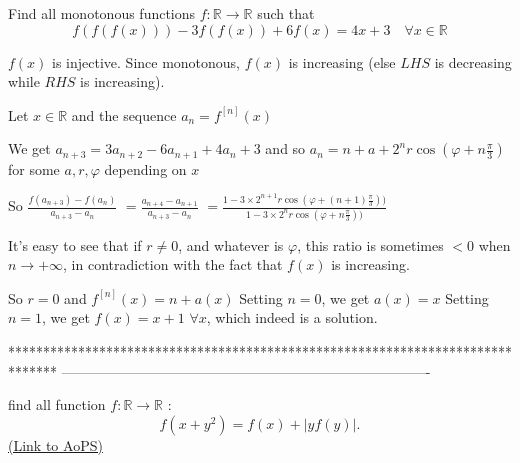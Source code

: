 \begin{solution}
	\begin{tcolorbox}Find all monotonous functions $f: \mathbb R\to\mathbb R$  such that 
\[f (f (f (x)))-3f (f (x))+6f (x) = 4x +3  \quad \forall x\in\mathbb R\]\end{tcolorbox}
$f(x)$ is injective.
Since monotonous, $f(x)$ is increasing (else $LHS$ is decreasing while $RHS$ is increasing).

Let $x\in\mathbb R$ and the sequence $a_n=f^{[n]}(x)$

We get $a_{n+3}=3a_{n+2}-6a_{n+1}+4a_n+3$ and so $a_n=n+a+2^nr\cos(\varphi +n\frac{\pi}3)$ for some $a,r,\varphi$ depending on $x$

So $\frac {f(a_{n+3})-f(a_{n})}{a_{n+3}-a_n}$ $=\frac{a_{n+4}-a_{n+1}}{a_{n+3}-a_n}$ $=\frac{1-3\times 2^{n+1}r\cos(\varphi +(n+1)\frac{\pi}3))}{1-3\times 2^{n}r\cos(\varphi +n\frac{\pi}3))}$

It's easy to see that if $r\ne 0$, and whatever is $\varphi$, this ratio is sometimes $<0$ when $n\to+\infty$, in contradiction with the fact that $f(x)$ is increasing.

So $r=0$ and $f^{[n]}(x)=n+a(x)$
Setting $n=0$, we get $a(x)=x$
Setting $n=1$, we get $\boxed{f(x)=x+1}$ $\forall x$, which indeed is a solution.
\end{solution}
*******************************************************************************
-------------------------------------------------------------------------------

\begin{problem}
	find all function $ f:\mathbb{R}\to\mathbb{R} $ : \[ f(x+y^2)=f(x)+|yf(y)|. \]
	\flushright \href{https://artofproblemsolving.com/community/c6h566588}{(Link to AoPS)}
\end{problem}



